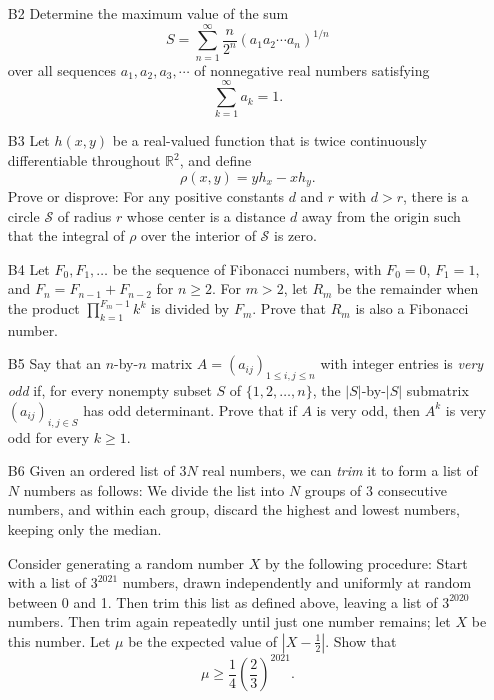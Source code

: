 \documentclass[amssymb,twocolumn,pra,10pt,aps,nofootinbib]{revtex4-1}
\begin{document}
\begin{itemize}
\item[B2]
Determine the maximum value of the sum
\[
S = \sum_{n=1}^\infty \frac{n}{2^n} (a_1 a_2 \cdots a_n)^{1/n}
\]
over all sequences $a_1, a_2, a_3, \cdots$ of nonnegative real numbers satisfying
\[
\sum_{k=1}^\infty a_k = 1.
\]

\item[B3]
Let $h(x,y)$ be a real-valued function that is twice continuously differentiable throughout $\mathbb{R}^2$, and define
\[
\rho(x,y) = yh_x - xh_y.
\]
Prove or disprove: For any positive constants $d$ and $r$ with $d>r$, there is a circle $\mathcal{S}$ of radius $r$ whose center is a distance $d$ away from the origin such that the integral of $\rho$ over the interior of $\mathcal{S}$ is zero.

\item[B4]
Let $F_0, F_1, \dots$ be the sequence of Fibonacci numbers, with $F_0 = 0$, $F_1 = 1$, and $F_n = F_{n-1} + F_{n-2}$ for $n \geq 2$. For $m > 2$, let $R_m$ be the remainder when the product $\prod_{k=1}^{F_m-1} k^k$ is divided by $F_m$. Prove that $R_m$ is also a Fibonacci number.

\item[B5]
Say that an $n$-by-$n$ matrix $A = (a_{ij})_{1 \leq i,j \leq n}$ with integer entries is \emph{very odd} if, for every nonempty subset $S$ of $\{1,2,\dots,n\}$, the $|S|$-by-$|S|$ submatrix $(a_{ij})_{i,j \in S}$ has odd determinant. Prove that if $A$ is very odd, then $A^k$ is very odd for every $k \geq 1$.

\item[B6]
Given an ordered list of $3N$ real numbers, we can \emph{trim} it to form a list of $N$ numbers as follows: We divide the list into $N$ groups of $3$ consecutive numbers, and within each group, discard the highest and lowest numbers, keeping only the median.

Consider generating a random number $X$ by the following procedure: Start with a list of $3^{2021}$ numbers, drawn independently and uniformly at random between 0 and 1. Then trim this list as defined above, leaving a list of $3^{2020}$ numbers. Then trim again repeatedly until just one number remains; let $X$ be this number. Let $\mu$ be the expected value of $|X - \frac{1}{2}|$. Show that
\[
\mu \geq \frac{1}{4} \left( \frac{2}{3} \right)^{2021}.
\]

\end{itemize}
\end{document}
